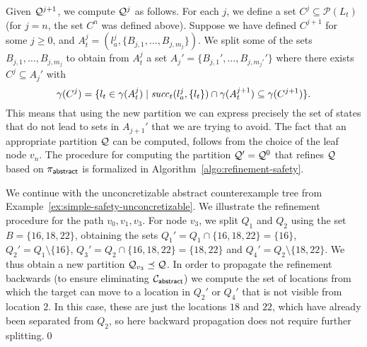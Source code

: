 Given $\mathcal{Q}^{j+1}$, we compute $\mathcal{Q}^j$ as follows. For each $j$, we define a set $C^j \subseteq \mathcal{P}(L_t)$ (for $j=n$, the set $C^n$ was defined above). Suppose we have defined $C^{j+1}$ for some $j \geq 0$, and $A_t^j = (l_a^j,\{B_{j,1},\ldots,B_{j,m_j}\})$. We split some of the sets $B_{j,1},\ldots,B_{j,m_j}$ to obtain from $A_t^j$ a set $A_j' = \{B_{j,1}',\ldots,B_{j,m_j'}'\}$ where there exists $C^j \subseteq A_j'$ with
\[\gamma(C^j) = \{l_t \in \gamma(A_t^j) \mid \mathit{succ}_t(l_a^j,\{l_t\}) \cap \gamma(A_t^{j+1}) \subseteq \gamma(C^{j+1})\}.\]
This means that using the new partition we can express precisely the set of states that do not lead to sets in $A_{j+1}'$ that we are trying to avoid. 
The fact that an appropriate partition $\mathcal{Q}$ can be computed, follows from the choice of the leaf node $v_n$. 
The procedure for computing the partition $\mathcal{Q}' = \mathcal{Q}^0$ that refines $\mathcal{Q}$ based on  $\pi_{\mathsf{abstract}}$ is formalized in Algorithm~\ref{algo:refinement-safety}.
\begin{example}
We continue with the unconcretizable abstract counterexample tree from Example~\ref{ex:simple-safety-unconcretizable}. We illustrate the refinement procedure for the path $v_0,v_1,v_3$. For node $v_3$, we split $Q_1$ and $Q_2$ using the set $B = \{16,18,22\}$, obtaining the sets $Q_1' = Q_1 \cap \{16,18,22\} = \{16\}$, $Q_2' = Q_1\setminus\{16\}$, $Q_3' = Q_2 \cap \{16,18,22\} = \{18,22\}$ and $Q_4' = Q_2 \setminus \{18,22\}$. We thus obtain a new partition $\mathcal{Q}_{v_3} \preceq \mathcal{Q}$. In order to propagate the refinement backwards (to ensure eliminating $\mathcal{C}_{\mathsf{abstract}}$) we compute the set of locations from which the target can move to a location in $Q_2'$ or $Q_4'$ that is not visible from location $2$. In this case, these are just the locations $18$ and $22$, which have already been separated from $Q_2$, so here backward propagation does not require further splitting.\qed
\end{example}

